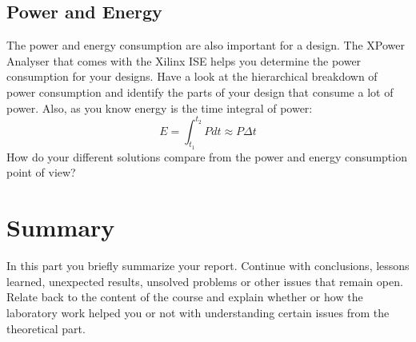 \documentclass[11pt]{article}
\begin{document}
\subsection{Power and Energy}
The power and energy consumption are also important for a design. The XPower Analyser that comes with the Xilinx ISE helps you determine the power consumption for your designs. Have a look at the hierarchical breakdown of power consumption and identify the parts of your design that consume a lot of power. Also, as you know energy is the time integral of power:
\begin{equation}
E = \int_{t_1}^{t_2} P dt \approx P \Delta t
\end{equation}
How do your different solutions compare from the power and energy consumption point of view?

\section{Summary}
In this part you briefly summarize your report. Continue with conclusions, lessons learned, unexpected results, unsolved problems or other issues that remain open. Relate back to the content of the course and explain whether or how the laboratory work helped you or not with understanding certain issues from the theoretical part.



\end{document}
